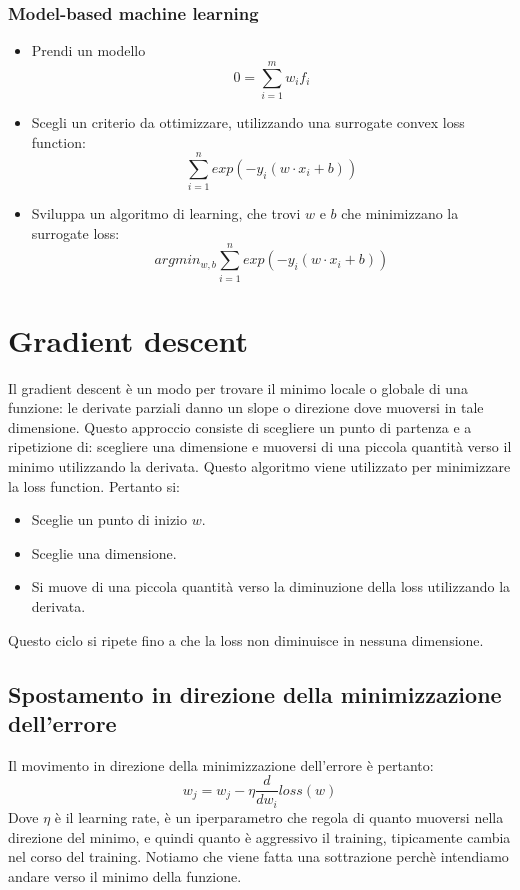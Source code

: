 		\subsubsection{Model-based machine learning}
		\begin{itemize}
			\item Prendi un modello 
			$$0=\sum\limits_{i=1}^m{w_i f_i}$$
			\item Scegli un criterio da ottimizzare, utilizzando una surrogate convex loss function:
			$$\sum\limits_{i=1}^n{exp(-y_i (w\cdot x_i+b))}$$
			\item Sviluppa un algoritmo di learning, che trovi $w$ e $b$ che minimizzano la surrogate loss: 
			$$argmin_{w,b}\sum\limits_{i=1}^n{exp(-y_i (w\cdot x_i+b))}$$
		\end{itemize}

\section{Gradient descent}
Il gradient descent \`e un modo per trovare il minimo locale o globale di una funzione: le derivate parziali danno un slope o direzione dove muoversi in tale dimensione.
Questo approccio consiste di scegliere un punto di partenza e a ripetizione di: scegliere una dimensione e muoversi di una piccola quantit\`a verso il minimo utilizzando la derivata. 
Questo algoritmo viene utilizzato per minimizzare la loss function.
Pertanto si:
\begin{itemize}
	\item Sceglie un punto di inizio $w$.
	\item Sceglie una dimensione.
	\item Si muove di una piccola quantit\`a verso la diminuzione della loss utilizzando la derivata.
\end{itemize}
Questo ciclo si ripete fino a che la loss non diminuisce in nessuna dimensione.

	\subsection{Spostamento in direzione della minimizzazione dell'errore}
	Il movimento in direzione della minimizzazione dell'errore \`e pertanto:
	$$w_j = w_j - \eta \dfrac{d}{dw_i}loss(w)$$
	Dove $\eta$ \`e il learning rate, \`e un iperparametro che regola di quanto muoversi nella direzione del minimo, e quindi quanto \`e aggressivo il training, tipicamente cambia nel corso del training.
	Notiamo che viene fatta una sottrazione perch\`e intendiamo andare verso il minimo della funzione.

